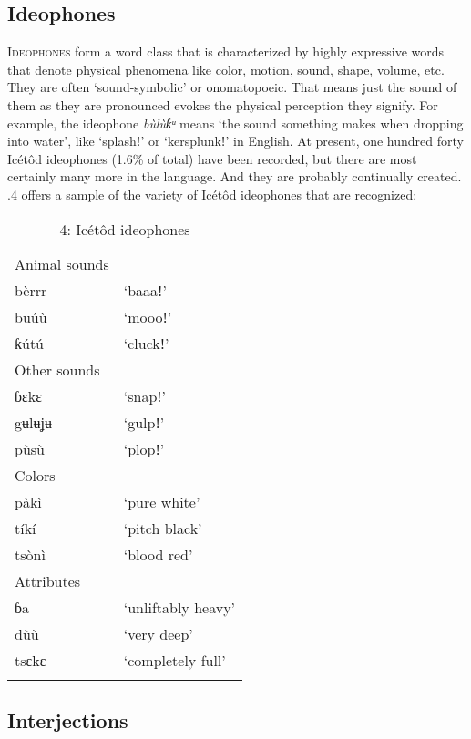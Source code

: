 \subsection{Ideophones}


\textsc{Ideophones} form a word class that is characterized by highly expressive words that denote physical phenomena like color, motion, sound, shape, volume, etc. They are often ‘sound-symbolic’ or onomatopoeic. That means just the sound of them as they are pronounced evokes the physical perception they signify. For example, the ideophone \textit{bùlùƙᵘ }means ‘the sound something makes when dropping into water’, like ‘splashǃ’ or ‘kersplunkǃ’ in English. At present, one hundred forty Icétôd ideophones (1.6\% of total) have been recorded, but there are most certainly many more in the language. And they are probably continually created. .4 offers a sample of the variety of Icétôd ideophones that are recognized:


\begin{table}
\caption{4: Icétôd ideophones}
\label{tab:3}


\begin{tabularx}{\textwidth}{XX}
\lsptoprule

Animal sounds & \\
bèrrr & ‘baaaǃ’\\
buúù & ‘moooǃ’\\
ƙútú & ‘cluckǃ’\\
Other sounds & \\
ɓɛkɛ & ‘snapǃ’\\
gʉlʉʝʉ & ‘gulpǃ’\\
pùsù & ‘plopǃ’\\
Colors & \\
pàkì & ‘pure white’\\
tíkí & ‘pitch black’\\
tsònì & ‘blood red’\\
Attributes & \\
ɓa & ‘unliftably heavy’\\
dùù & ‘very deep’\\
tsɛkɛ & ‘completely full’\\
\lspbottomrule
\end{tabularx}
\end{table}



\subsection{Interjections}


